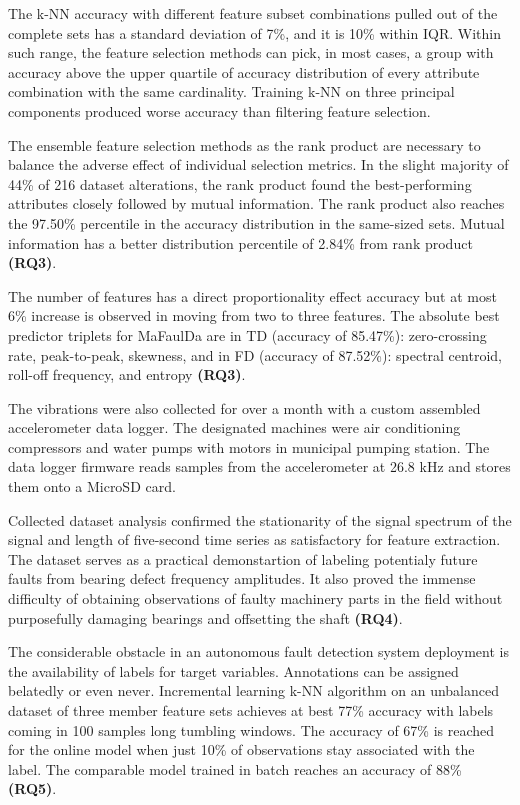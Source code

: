 The k-NN accuracy with different feature subset combinations pulled out of the complete sets has a standard deviation of 7\%, and it is 10\% within IQR. Within such range, the feature selection methods can pick, in most cases, a group with accuracy above the upper quartile of accuracy distribution of every attribute combination with the same cardinality. Training k-NN on three principal components produced worse accuracy than filtering feature selection.

The ensemble feature selection methods as the rank product are necessary to balance the adverse effect of individual selection metrics. In the slight majority of 44\% of 216 dataset alterations, the rank product found the best-performing attributes closely followed by mutual information. The rank product also reaches the 97.50\% percentile in the accuracy distribution in the same-sized sets. Mutual information has a better distribution percentile of 2.84\% from rank product \textbf{(RQ3)}. 

The number of features has a direct proportionality effect accuracy but at most 6\% increase is observed in moving from two to three features. The absolute best predictor triplets for MaFaulDa are in TD (accuracy of 85.47\%): zero-crossing rate, peak-to-peak, skewness, and in FD (accuracy of 87.52\%): spectral centroid, roll-off frequency, and entropy \textbf{(RQ3)}.

The vibrations were also collected for over a month with a custom assembled accelerometer data logger. The designated machines were air conditioning compressors and water pumps with motors in municipal pumping station. The data logger firmware reads samples from the accelerometer at 26.8 kHz and stores them onto a MicroSD card.

Collected dataset analysis confirmed the stationarity of the signal spectrum of the signal and length of five-second time series as satisfactory for feature extraction. The dataset serves as a practical demonstartion of labeling potentialy future faults from bearing defect frequency amplitudes. It also proved the immense difficulty of obtaining observations of faulty machinery parts in the field without purposefully damaging bearings and offsetting the shaft \textbf{(RQ4)}.

The considerable obstacle in an autonomous fault detection system deployment is the availability of labels for target variables. Annotations can be assigned belatedly or even never. Incremental learning k-NN algorithm on an unbalanced dataset of three member feature sets achieves at best 77\% accuracy with labels coming in 100 samples long tumbling windows. The accuracy of 67\% is reached for the online model when just 10\% of observations stay associated with the label. The comparable model trained in batch reaches an accuracy of 88\% \textbf{(RQ5)}.

